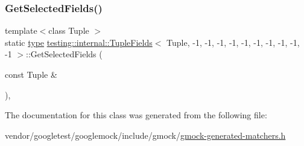 \subsubsection{\texorpdfstring{Get\+Selected\+Fields()}{GetSelectedFields()}}
{\footnotesize\ttfamily template$<$class Tuple $>$ \\
static \hyperlink{classtesting_1_1internal_1_1_tuple_fields_3_01_tuple_00_01-1_00_01-1_00_01-1_00_01-1_00_01-1_00_c541d4fe72f9dece2f1a50ee33bb16df_a853fa65a18c6b392327ae2cf59bc9571}{type} \hyperlink{classtesting_1_1internal_1_1_tuple_fields}{testing\+::internal\+::\+Tuple\+Fields}$<$ Tuple, -\/1, -\/1, -\/1, -\/1, -\/1, -\/1, -\/1, -\/1, -\/1, -\/1 $>$\+::Get\+Selected\+Fields (\begin{DoxyParamCaption}\item[{const Tuple \&}]{ }\end{DoxyParamCaption})\hspace{0.3cm}{\ttfamily [inline]}, {\ttfamily [static]}}



The documentation for this class was generated from the following file\+:\begin{DoxyCompactItemize}
\item 
vendor/googletest/googlemock/include/gmock/\hyperlink{gmock-generated-matchers_8h}{gmock-\/generated-\/matchers.\+h}\end{DoxyCompactItemize}

